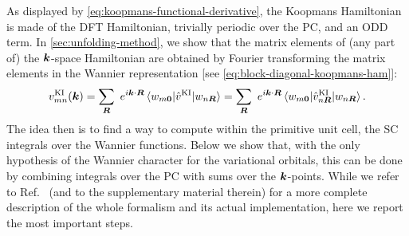 As displayed by \cref{eq:koopmans-functional-derivative}, the Koopmans Hamiltonian is made of the DFT Hamiltonian, trivially periodic over the PC, and an ODD term. In \cref{sec:unfolding-method}, we show that the matrix elements of (any part of) the ${\bm k}$-space Hamiltonian are obtained by Fourier transforming the matrix elements in the Wannier representation [see \cref{eq:block-diagonal-koopmans-ham}]:
%
\begin{equation}
    v^{\rm KI}_{mn}({\bm k}) = \sum_{{\bm R}} \ e^{i {\bm k} \cdot {\bm R}} \braket{w_{m{\bm 0}}|\hat{v}^{\rm KI}|w_{n{\bm R}}} = \sum_{{\bm R}} \ e^{i {\bm k} \cdot {\bm R}} \braket{w_{m{\bm 0}}|\hat{v}^{\rm KI}_{n{\bm R}}|w_{n{\bm R}}} .
    \label{eq:ki-ham-kcw}
\end{equation}
%
The idea then is to find a way to compute within the primitive unit cell, the SC integrals over the Wannier functions. Below we show that, with the only hypothesis of the Wannier character for the variational orbitals, this can be done by combining integrals over the PC with sums over the ${\bm k}$-points. While we refer to Ref.~\cite{colonna_koopmans_2022} (and to the supplementary material therein) for a more complete description of the whole formalism and its actual implementation, here we report the most important steps.

